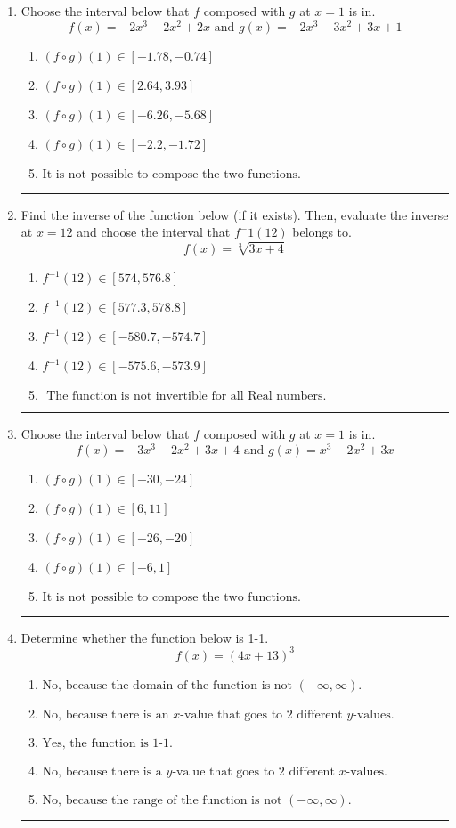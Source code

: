 \documentclass[14pt]{extbook}
\newcommand{\litem}[1]{\item#1\hspace*{-1cm}\rule{\textwidth}{0.4pt}}
\begin{document}
\begin{enumerate}
{\begin{enumerate}[label=\Alph*.]
\end{enumerate} }
\litem{
Choose the interval below that $f$ composed with $g$ at $x=1$ is in.\[ f(x) = -2x^{3} -2 x^{2} +2 x \text{ and } g(x) = -2x^{3} -3 x^{2} +3 x + 1 \]\begin{enumerate}[label=\Alph*.]
\item \( (f \circ g)(1) \in [-1.78, -0.74] \)
\item \( (f \circ g)(1) \in [2.64, 3.93] \)
\item \( (f \circ g)(1) \in [-6.26, -5.68] \)
\item \( (f \circ g)(1) \in [-2.2, -1.72] \)
\item \( \text{It is not possible to compose the two functions.} \)

\end{enumerate} }
\litem{
Find the inverse of the function below (if it exists). Then, evaluate the inverse at $x = 12$ and choose the interval that $f^-1(12)$ belongs to.\[ f(x) = \sqrt[3]{3 x + 4} \]\begin{enumerate}[label=\Alph*.]
\item \( f^{-1}(12) \in [574, 576.8] \)
\item \( f^{-1}(12) \in [577.3, 578.8] \)
\item \( f^{-1}(12) \in [-580.7, -574.7] \)
\item \( f^{-1}(12) \in [-575.6, -573.9] \)
\item \( \text{ The function is not invertible for all Real numbers. } \)

\end{enumerate} }
\litem{
Choose the interval below that $f$ composed with $g$ at $x=1$ is in.\[ f(x) = -3x^{3} -2 x^{2} +3 x + 4 \text{ and } g(x) = x^{3} -2 x^{2} +3 x \]\begin{enumerate}[label=\Alph*.]
\item \( (f \circ g)(1) \in [-30, -24] \)
\item \( (f \circ g)(1) \in [6, 11] \)
\item \( (f \circ g)(1) \in [-26, -20] \)
\item \( (f \circ g)(1) \in [-6, 1] \)
\item \( \text{It is not possible to compose the two functions.} \)

\end{enumerate} }
\litem{
Determine whether the function below is 1-1.\[ f(x) = (4 x + 13)^3 \]\begin{enumerate}[label=\Alph*.]
\item \( \text{No, because the domain of the function is not $(-\infty, \infty)$.} \)
\item \( \text{No, because there is an $x$-value that goes to 2 different $y$-values.} \)
\item \( \text{Yes, the function is 1-1.} \)
\item \( \text{No, because there is a $y$-value that goes to 2 different $x$-values.} \)
\item \( \text{No, because the range of the function is not $(-\infty, \infty)$.} \)


\end{enumerate}}
\end{enumerate}
\end{document}
